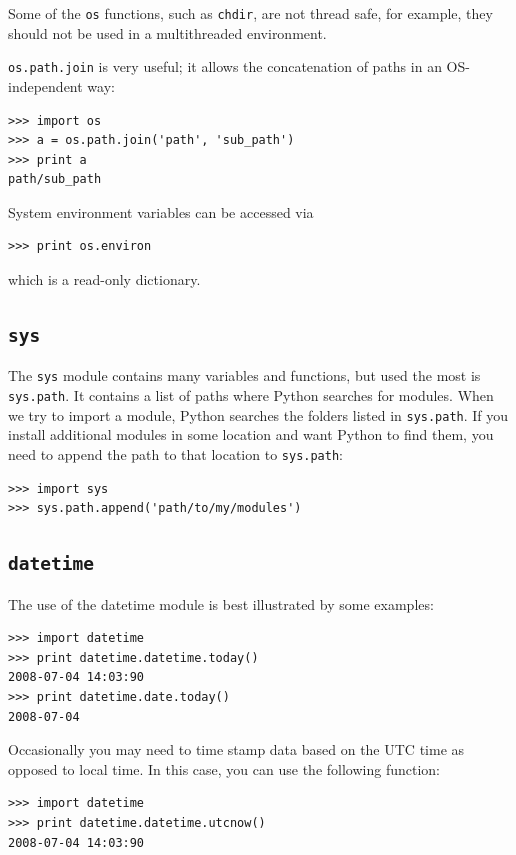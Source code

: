 \documentclass[justified,sixbynine]{tufte-book}
\def\ft{\small\tt}
\theoremstyle{plain}%
\theoremstyle{definition}
\theoremstyle{remark}
\begin{document}
\begin{fullwidth}
Some of the {\ft os} functions, such as {\ft chdir}, are not thread safe, for example, they should not be used in a multithreaded environment.

{\ft os.path.join} is very useful; it allows the concatenation of paths in an OS-independent way:
\begin{lstlisting}
>>> import os
>>> a = os.path.join('path', 'sub_path')
>>> print a
path/sub_path
\end{lstlisting}

System environment variables can be accessed via
\begin{lstlisting}
>>> print os.environ
\end{lstlisting}
\noindent which is a read-only dictionary.

\goodbreak\subsection{{\ft sys}}

 

The {\ft sys} module contains many variables and functions, but used the most is {\ft sys.path}. It contains a list of paths where Python searches for modules. When we try to import a module, Python searches the folders listed in {\ft sys.path}. If you install additional modules in some location and want Python to find them, you need to append the path to that location to {\ft sys.path}:
\begin{lstlisting}
>>> import sys
>>> sys.path.append('path/to/my/modules')
\end{lstlisting}

\goodbreak\subsection{{\ft datetime}}

  

The use of the datetime module is best illustrated by some examples:
\begin{lstlisting}
>>> import datetime
>>> print datetime.datetime.today()
2008-07-04 14:03:90
>>> print datetime.date.today()
2008-07-04
\end{lstlisting}

Occasionally you may need to time stamp data based on the UTC time as opposed to local time. In this case, you can use the following function:
\begin{lstlisting}
>>> import datetime
>>> print datetime.datetime.utcnow()
2008-07-04 14:03:90
\end{lstlisting}


\end{fullwidth}
\end{document}
